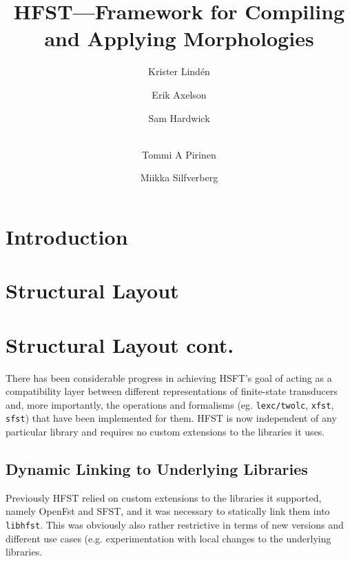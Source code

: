 \documentclass{llncs}
\begin{document}
%
\title{HFST---Framework for Compiling and Applying Morphologies}
%
\author{Krister Lind\'{e}n \and Erik Axelson \and Sam Hardwick \and\\
Tommi A Pirinen \and Miikka Silfverberg}


\maketitle


%
\begin{abstract}
\end{abstract}

\section*{Introduction}


\section{Structural Layout}


\section{Structural Layout cont.}
There has been considerable progress in achieving HSFT's goal of acting as a
compatibility layer between different representations of finite-state
transducers and, more importantly, the operations and formalisms (eg.
\verb+lexc/twolc+, \verb+xfst+, \verb+sfst+) that have been implemented
for them. HFST is now independent of any particular library and requires no
custom extensions to the libraries it uses.

\subsection{Dynamic Linking to Underlying Libraries}
Previously HFST relied on custom extensions to the libraries it supported,
namely OpenFst and SFST, and it was necessary to statically link them into
\verb+libhfst+. This was obviously also rather restrictive in terms of
new versions and different use cases (e.g. experimentation with local changes to
the underlying libraries.
\end{document}
